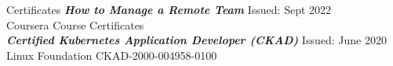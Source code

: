 \begin{section}{Certificates}
    {\sl \textbf{How to Manage a Remote Team}} \hfill Issued: Sept 2022\\
    Coursera Course Certificates \\

    {\sl \textbf{Certified Kubernetes Application Developer (CKAD)}} \hfill Issued: June 2020\\
    Linux Foundation \hfill CKAD-2000-004958-0100 \\
\end{section}